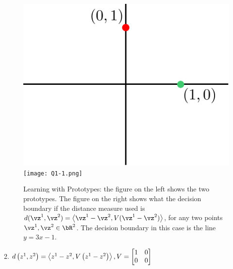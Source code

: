 \documentclass[a4paper,11pt]{article}
\begin{document}
\begin{mlsolution}
\begin{figure}[th]%
\centering
\includegraphics[width=0.3\columnwidth]{proto_blank.png}%
\hfill
\texttt{[image: Q1-1.png]}%
\caption{Learning with Prototypes: the figure on the left shows the two prototypes. The figure on the right shows what the decision boundary if the distance measure used is $d(\vz^1,\vz^2) = \left \langle \vz^1-\vz^2, V (\vz^1-\vz^2) \right \rangle$, for any two points $\vz^1,\vz^2 \in \bR^2$. The decision boundary in this case is the line $y = 3x-1$.}%
\label{fig:proto1}%
\end{figure}

2.  \begin{math}
 d\left ( z^{1}, \space z^{2} \right ) = \left \langle z^{1} - z^{2}, \space V \left ( z^{1} - z^{2} \right ) \right \rangle, V = \begin{bmatrix} 
1 & 0 \\ 0 & 0 \end{bmatrix} \\ \end{math}


\end{mlsolution}
\end{document}
